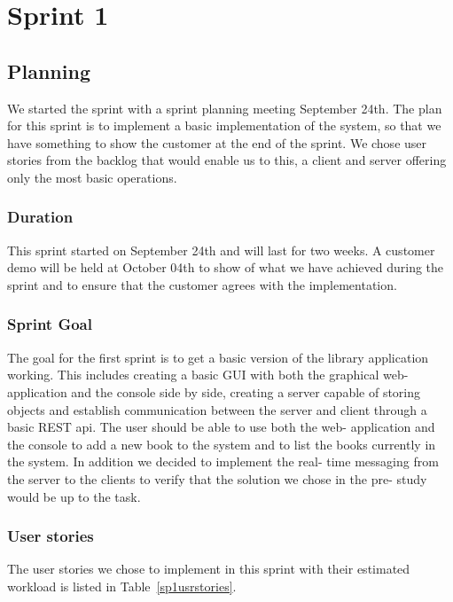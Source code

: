 \chapter{Sprint 1}
\section{Planning}
We started the sprint with a sprint planning meeting September 24th. The plan for this sprint is to implement a basic implementation of the system, so that we have something to show the customer at the end of the sprint. We chose user stories from the backlog that would enable us to this, a client and server offering only the most basic operations. 

\subsection{Duration}
This sprint started on September 24th and will last for two weeks. A customer demo will be held at October 04th to show of what we have achieved during the sprint and to ensure that the customer agrees with the implementation.

\subsection{Sprint Goal}
The goal for the first sprint is to get a basic version of the library application working. This includes creating a basic GUI with both the graphical web- application and the console side by side, creating a server capable of storing objects and establish communication between the server and client through a basic REST api. The user should be able to use both the web- application and the console to add a new book to the system and to list the books currently in the system. In addition we decided to implement the real- time messaging from the server to the clients to verify that the solution we chose in the pre- study would be up to the task.

\subsection{User stories}
The user stories we chose to implement in this sprint with their estimated workload is listed in Table~\ref{sp1usrstories}.

